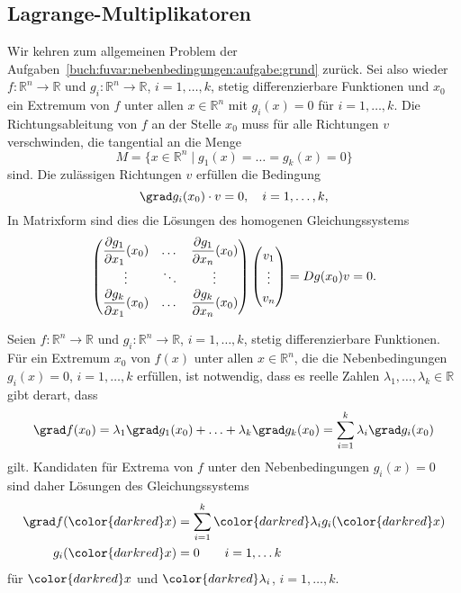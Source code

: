 \subsection{Lagrange-Multiplikatoren}
Wir kehren zum allgemeinen Problem der
Aufgaben~\ref{buch:fuvar:nebenbedingungen:aufgabe:grund}
zurück.
Sei also wieder $f\colon \mathbb{R}^n\to\mathbb{R}$
und
$g_i\colon\mathbb{R}^n\to\mathbb{R}$, $i=1,\dots,k$,
stetig differenzierbare Funktionen und $x_0$ ein Extremum
von $f$ unter allen $x\in\mathbb{R}^n$ mit $g_i(x)=0$ für $i=1,\dots,k$.
Die Richtungsableitung von $f$ an der Stelle $x_0$ muss für alle
Richtungen $v$ verschwinden, die tangential an die Menge
\[
M
=
\{
x\in\mathbb{R}^n
\mid
g_1(x)=\ldots=g_k(x)=0
\}
\]
sind.
Die zulässigen Richtungen $v$ erfüllen die Bedingung
\[
\grad g_i(x_0)\cdot v  = 0,\quad i=1,\dots,k,
\]
In Matrixform sind dies die Lösungen des homogenen Gleichungssystems
\[
{\renewcommand{\arraystretch}{1.2}
\begin{pmatrix}
\displaystyle\frac{\partial g_1}{\partial x_1}(x_0)
&\dots&
\displaystyle\frac{\partial g_1}{\partial x_n}(x_0)
\\
\vdots&\ddots&\vdots\\
\displaystyle\frac{\partial g_k}{\partial x_1}(x_0)
&\dots&
\displaystyle\frac{\partial g_k}{\partial x_n}(x_0)
\end{pmatrix}}
\begin{pmatrix}
v_1\\
\vdots\\
v_n
\end{pmatrix}
=
Dg(x_0) v
=
0.
\]

\begin{satz}
\label{buch:fuvar:nebenbedingungen:satz:lm}
Seien $f\colon\mathbb{R}^n\to\mathbb{R}$ und
$g_i\colon\mathbb{R}^n\to\mathbb{R}$, $i=1,\dots,k$, stetig
differenzierbare Funktionen.
Für ein Extremum $x_0$ von $f(x)$ unter allen $x\in\mathbb{R}^n$,
die die Nebenbedingungen $g_i(x)=0$, $i=1,\dots,k$ erfüllen, ist notwendig,
dass es reelle Zahlen $\lambda_1,\dots,\lambda_k\in\mathbb{R}$ gibt derart,
dass
\[
\grad f(x_0)
=
\lambda_1\grad g_1(x_0)
+\ldots+
\lambda_k\grad g_k(x_0)
=
\sum_{i=1}^k \lambda_i \grad g_i(x_0)
\]
gilt.
Kandidaten für Extrema von $f$ unter den Nebenbedingungen $g_i(x)=0$ sind
daher Lösungen des Gleichungssystems
\begin{equation}
\begin{aligned}
\grad f({\color{darkred}x})
&=
\sum_{i=1}^k {\color{darkred}\lambda_i} g_i({\color{darkred}x})
\\
g_i({\color{darkred}x})
&= 
0\qquad i=1,\dots k
\end{aligned}
\label{buch:fuvar:nebenbedingungen:eqn:lm}
\end{equation}
für ${\color{darkred}x}$ und ${\color{darkred}\lambda_i}$, $i=1,\dots,k$.
\end{satz}

